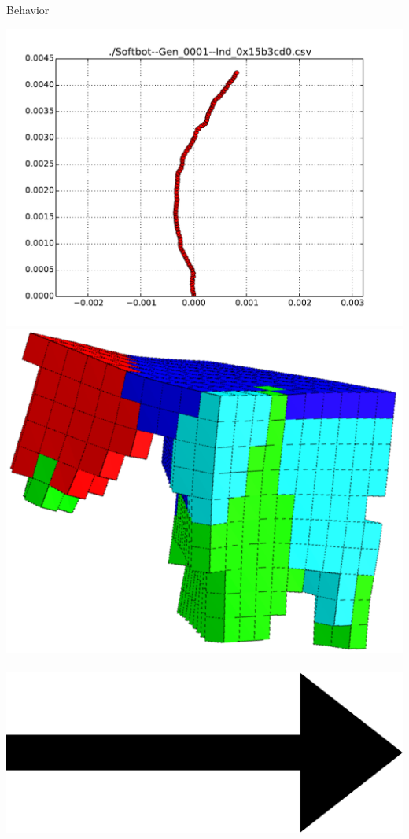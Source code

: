 \documentclass{beamer}
\begin{document}
\begin{frame}{Behavior}
\begin{center}
\includegraphics[height=0.15\textheight]{figures/behaviorTrajectory.pdf}
\\
\includegraphics[height=0.15\textheight]{figures/unshacklingEvolutionFigure2.png}\	
\includegraphics[height=0.05\textheight]{figures/Arrow_east.eps}\	

\end{center}
\end{frame}
\end{document}
